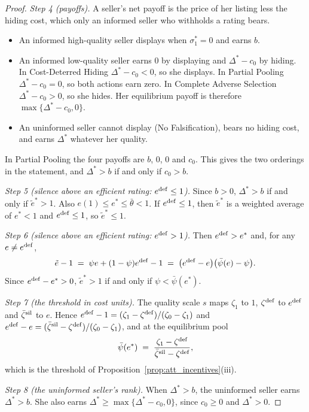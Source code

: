 \begin{proof}
\emph{Step 4 (payoffs).} A seller's net payoff is the price of her listing less the hiding cost, which only an informed seller who withholds a rating bears.
\begin{itemize}
    \item An informed high-quality seller displays when $\sigma_1^*=0$ and earns $b$.
    \item An informed low-quality seller earns $0$ by displaying and $\Delta^*-c_0$ by hiding. In Cost-Deterred Hiding $\Delta^*-c_0<0$, so she displays. In Partial Pooling $\Delta^*-c_0=0$, so both actions earn zero. In Complete Adverse Selection $\Delta^*-c_0>0$, so she hides. Her equilibrium payoff is therefore $\max\{\Delta^*-c_0,0\}$.
    \item An uninformed seller cannot display (No Falsification), bears no hiding cost, and earns $\Delta^*$ whatever her quality.
\end{itemize}
In Partial Pooling the four payoffs are $b$, $0$, $0$ and $c_0$. This gives the two orderings in the statement, and $\Delta^*>b$ if and only if $c_0>b$.

\emph{Step 5 (silence above an efficient rating: $e^{\rm def}\le1$).} Since $b>0$, $\Delta^*>b$ if and only if $\tilde e^*>1$. Also $e(1)\le e^*\le\bar\theta<1$. If $e^{\rm def}\le1$, then $\tilde e^*$ is a weighted average of $e^*<1$ and $e^{\rm def}\le1$, so $\tilde e^*\le1$.

\emph{Step 6 (silence above an efficient rating: $e^{\rm def}>1$).} Then $e^{\rm def}>e^*$ and, for any $e\neq e^{\rm def}$,
\begin{equation*}
    \tilde e-1\;=\;\psi e+(1-\psi)e^{\rm def}-1\;=\;\big(e^{\rm def}-e\big)\big(\bar\psi(e)-\psi\big).
\end{equation*}
Since $e^{\rm def}-e^*>0$, $\tilde e^*>1$ if and only if $\psi<\bar\psi(e^*)$.

\emph{Step 7 (the threshold in cost units).} The quality scale $s$ maps $\zeta_1$ to $1$, $\zeta^{\rm def}$ to $e^{\rm def}$ and $\bar \zeta^{\rm sil}$ to $e$. Hence $e^{\rm def}-1=(\zeta_1-\zeta^{\rm def})/(\zeta_0-\zeta_1)$ and $e^{\rm def}-e=(\bar \zeta^{\rm sil}-\zeta^{\rm def})/(\zeta_0-\zeta_1)$, and at the equilibrium pool
\begin{equation*}
    \bar\psi(e^*)\;=\;\frac{\zeta_1-\zeta^{\rm def}}{\bar \zeta^{\rm sil}-\zeta^{\rm def}},
\end{equation*}
which is the threshold of Proposition~\ref{prop:att_incentives}(iii).

\emph{Step 8 (the uninformed seller's rank).} When $\Delta^*>b$, the uninformed seller earns $\Delta^*>b$. She also earns $\Delta^*\ge\max\{\Delta^*-c_0,0\}$, since $c_0\ge0$ and $\Delta^*>0$.


\end{proof}
